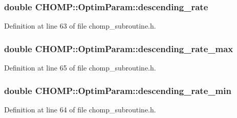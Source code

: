 \subsubsection[{\texorpdfstring{descending\+\_\+rate}{descending_rate}}]{\setlength{\rightskip}{0pt plus 5cm}double C\+H\+O\+M\+P\+::\+Optim\+Param\+::descending\+\_\+rate}\hypertarget{struct_c_h_o_m_p_1_1_optim_param_a24f769bd28ca6ecceadb0b88a6e5c8fa}{}\label{struct_c_h_o_m_p_1_1_optim_param_a24f769bd28ca6ecceadb0b88a6e5c8fa}


Definition at line 63 of file chomp\+\_\+subroutine.\+h.

\subsubsection[{\texorpdfstring{descending\+\_\+rate\+\_\+max}{descending_rate_max}}]{\setlength{\rightskip}{0pt plus 5cm}double C\+H\+O\+M\+P\+::\+Optim\+Param\+::descending\+\_\+rate\+\_\+max}\hypertarget{struct_c_h_o_m_p_1_1_optim_param_a3ad3b5a547e99a6073c7ab0a40e04ab3}{}\label{struct_c_h_o_m_p_1_1_optim_param_a3ad3b5a547e99a6073c7ab0a40e04ab3}


Definition at line 65 of file chomp\+\_\+subroutine.\+h.

\subsubsection[{\texorpdfstring{descending\+\_\+rate\+\_\+min}{descending_rate_min}}]{\setlength{\rightskip}{0pt plus 5cm}double C\+H\+O\+M\+P\+::\+Optim\+Param\+::descending\+\_\+rate\+\_\+min}\hypertarget{struct_c_h_o_m_p_1_1_optim_param_a2d508c9266b950e05f908b8445dc95ee}{}\label{struct_c_h_o_m_p_1_1_optim_param_a2d508c9266b950e05f908b8445dc95ee}


Definition at line 64 of file chomp\+\_\+subroutine.\+h.

